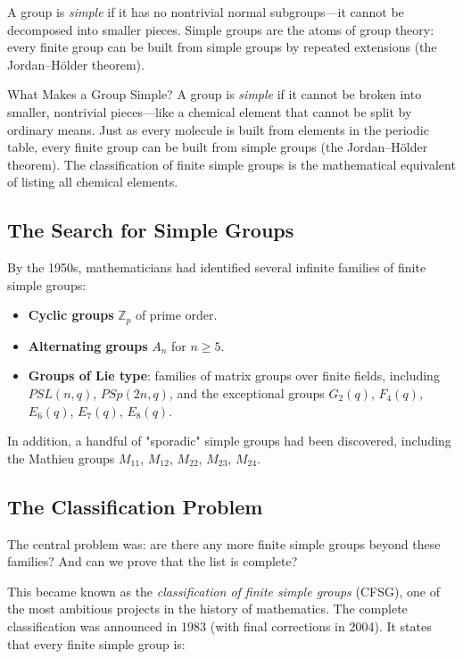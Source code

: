 A group is \emph{simple} if it has no nontrivial normal subgroups---it cannot be decomposed into smaller pieces. Simple groups are the atoms of group theory: every finite group can be built from simple groups by repeated extensions (the Jordan--H\"older theorem).

\begin{knowledgebridge}{What Makes a Group Simple?}
A group is \emph{simple} if it cannot be broken into smaller, nontrivial pieces---like a chemical element that cannot be split by ordinary means. Just as every molecule is built from elements in the periodic table, every finite group can be built from simple groups (the Jordan--H\"older theorem). The classification of finite simple groups is the mathematical equivalent of listing all chemical elements.
\end{knowledgebridge}

\subsection{The Search for Simple Groups}

By the 1950s, mathematicians had identified several infinite families of finite simple groups:

\begin{itemize}
\item \textbf{Cyclic groups} $\mathbb{Z}_p$ of prime order.
\item \textbf{Alternating groups} $A_n$ for $n \geq 5$.
\item \textbf{Groups of Lie type}: families of matrix groups over finite fields, including $PSL(n, q)$, $PSp(2n, q)$, and the exceptional groups $G_2(q)$, $F_4(q)$, $E_6(q)$, $E_7(q)$, $E_8(q)$.
\end{itemize}

In addition, a handful of "sporadic" simple groups had been discovered, including the Mathieu groups $M_{11}$, $M_{12}$, $M_{22}$, $M_{23}$, $M_{24}$.

\subsection{The Classification Problem}

The central problem was: are there any more finite simple groups beyond these families? And can we prove that the list is complete?

This became known as the \emph{classification of finite simple groups} (CFSG), one of the most ambitious projects in the history of mathematics. The complete classification was announced in 1983 (with final corrections in 2004). It states that every finite simple group is:

